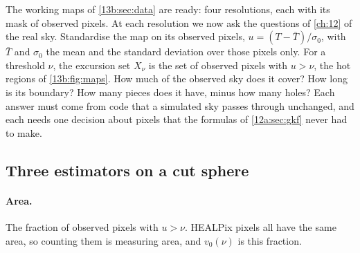 The working maps of \cref{13b:sec:data} are ready: four resolutions, each with its mask of observed pixels. At
each resolution we now ask the questions of \cref{ch:12} of the real sky. Standardise the map on its observed
pixels, $u=(T-\bar T)/\sigma_0$, with $\bar T$ and $\sigma_0$ the mean and the standard deviation over those
pixels only. For a threshold $\nu$, the excursion set $X_\nu$ is the set of observed pixels with $u>\nu$, the
hot regions of \cref{13b:fig:maps}. How much of the observed sky does it cover? How long is its boundary? How many
pieces does it have, minus how many holes? Each answer must come from code that a simulated sky passes through
unchanged, and each needs one decision about pixels that the formulas of \cref{12a:sec:gkf} never had to make.

\subsection{Three estimators on a cut sphere}
\label{13b:sec:estimators}

\paragraph{Area.} The fraction of observed pixels with $u>\nu$. HEALPix pixels all have the same area, so
counting them is measuring area, and $v_0(\nu)$ is this fraction.


